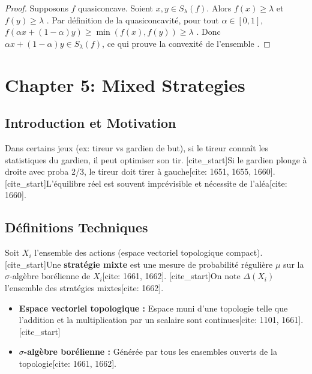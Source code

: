 \begin{proof}
Supposons $f$ quasiconcave. Soient $x, y \in S_{\lambda}(f)$. Alors $f(x) \ge \lambda$ et $f(y) \ge \lambda$ \cite{Note 10 oct. 2024.pdf}. Par définition de la quasiconcavité, pour tout $\alpha \in [0,1]$, $f(\alpha x + (1-\alpha)y) \ge \min(f(x), f(y)) \ge \lambda$ \cite{Note 10 oct. 2024.pdf}. Donc $\alpha x + (1-\alpha)y \in S_{\lambda}(f)$, ce qui prouve la convexité de l'ensemble \cite{Note 10 oct. 2024.pdf}.
\end{proof}

\newpage
\section{Chapter 5: Mixed Strategies}

\subsection{Introduction et Motivation}
Dans certains jeux (ex: tireur vs gardien de but), si le tireur connaît les statistiques du gardien, il peut optimiser son tir. [cite_start]Si le gardien plonge à droite avec proba 2/3, le tireur doit tirer à gauche[cite: 1651, 1655, 1660]. [cite_start]L'équilibre réel est souvent imprévisible et nécessite de l'aléa[cite: 1660].

\subsection{Définitions Techniques}
\begin{definition}
Soit $X_i$ l'ensemble des actions (espace vectoriel topologique compact). [cite_start]Une \textbf{stratégie mixte} est une mesure de probabilité régulière $\mu$ sur la $\sigma$-algèbre borélienne de $X_i$[cite: 1661, 1662].
[cite_start]On note $\Delta(X_i)$ l'ensemble des stratégies mixtes[cite: 1662].
\end{definition}

\begin{itemize}
    [cite_start]\item \textbf{Espace vectoriel topologique :} Espace muni d'une topologie telle que l'addition et la multiplication par un scalaire sont continues[cite: 1101, 1661].
    [cite_start]\item \textbf{$\sigma$-algèbre borélienne :} Générée par tous les ensembles ouverts de la topologie[cite: 1661, 1662].
\end{itemize}

